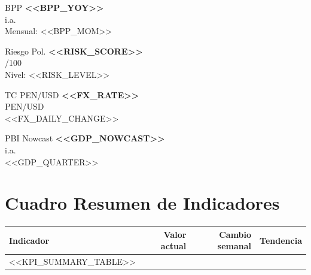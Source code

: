\documentclass[10pt,a4paper]{article}
\newcommand{\kpivalue}[1]{%
  {\fontsize{16}{18}\selectfont\bfseries\color{ink}#1}%
}
\newcommand{\kpilabel}[1]{%
  {\small\color{ink3}#1}%
}
\begin{document}
\noindent
\begin{minipage}[t]{0.23\textwidth}
  \begin{kpibox}{BPP}
    \kpivalue{<<BPP_YOY>>}\\[2pt]
    \kpilabel{i.a.}\\[3pt]
    \kpilabel{Mensual: <<BPP_MOM>>}
  \end{kpibox}
\end{minipage}%
\hfill
\begin{minipage}[t]{0.23\textwidth}
  \begin{kpibox}{Riesgo Pol.}
    \kpivalue{<<RISK_SCORE>>}\\[2pt]
    \kpilabel{/100}\\[3pt]
    \kpilabel{Nivel: <<RISK_LEVEL>>}
  \end{kpibox}
\end{minipage}%
\hfill
\begin{minipage}[t]{0.23\textwidth}
  \begin{kpibox}{TC PEN/USD}
    \kpivalue{<<FX_RATE>>}\\[2pt]
    \kpilabel{PEN/USD}\\[3pt]
    \kpilabel{<<FX_DAILY_CHANGE>>}
  \end{kpibox}
\end{minipage}%
\hfill
\begin{minipage}[t]{0.23\textwidth}
  \begin{kpibox}{PBI Nowcast}
    \kpivalue{<<GDP_NOWCAST>>}\\[2pt]
    \kpilabel{i.a.}\\[3pt]
    \kpilabel{<<GDP_QUARTER>>}
  \end{kpibox}
\end{minipage}

\vspace{0.8em}

\section{Cuadro Resumen de Indicadores}

\begin{center}
\begin{tabular}{lrrl}
  \toprule
  \textbf{Indicador} & \textbf{Valor actual} & \textbf{Cambio semanal} & \textbf{Tendencia} \\
  \midrule
<<KPI_SUMMARY_TABLE>>  \bottomrule
\end{tabular}
\end{center}
\end{document}

